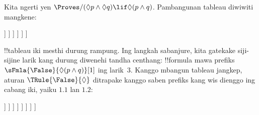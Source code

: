 \documentclass[../../../include/open-logic-section]{subfiles}
\begin{document}
{
\begin{ex}
  Kita ngerti yen $\Proves/ (\Diamond p \land \Diamond q) \lif \Diamond(p
  \land q)$. Pambangunan tableau diwiwiti mangkene:
  \begin{oltableau}
    [\pFmla{\False}{(\Diamond p \land \Diamond q) \lif \Diamond(p \land q)}{1},
      just = \TAss, checked
      [\pFmla{\True}{\Diamond p \land \Diamond q}{1},
        just = {\TRule{\False}{\lif}[1]}, checked
        [\pFmla{\False}{\Diamond(p \land q)}{1},
          just = {\TRule{\False}{\lif}[1]}
          [\pFmla{\True}{\Diamond p}{1},
            just = {\TRule{\True}{\land}[2]}, checked
            [\pFmla{\True}{\Diamond q}{1},
              just = {\TRule{\True}{\land}[2]}, checked
              [\pFmla{\True}{p}{1.1}, 
                just = {\TRule{\True}{\Diamond}[4]}, checked
                [\pFmla{\True}{q}{1.2}, 
                  just = {\TRule{\True}{\Diamond}[5]}, checked
                ]
              ]
            ]
          ]
        ]
      ]
    ]
  \end{oltableau}
  !!{tableau} iki mesthi durung rampung. Ing langkah sabanjure,
  kita gatekake siji-sijine larik kang durung diwenehi tandha centhang:
  !!{formula} mawa prefiks $\sFmla{\False}{\Diamond(p \land q)}[1]$
  ing larik~$3$. Kanggo mbangun tableau jangkep, aturan
  $\TRule{\False}{\Diamond}$ ditrapake kanggo saben prefiks kang wis
  dienggo ing cabang iki, yaiku $1.1$ lan $1.2$:
  \begin{oltableau}
    [\pFmla{\False}{(\Diamond p \land \Diamond q) \lif \Diamond(p \land q)}{1},
      just = \TAss, checked
      [\pFmla{\True}{\Diamond p \land \Diamond q}{1},
        just = {\TRule{\False}{\lif}[1]}, checked
        [\pFmla{\False}{\Diamond (p \land q)}{1},
          just = {\TRule{\False}{\lif}[1]}
          [\pFmla{\True}{\Diamond p}{1},
            just = {\TRule{\True}{\land}[2]}, checked
            [\pFmla{\True}{\Diamond q}{1},
              just = {\TRule{\True}{\land}[2]}, checked
              [\pFmla{\True}{p}{1.1}, 
                just = {\TRule{\True}{\Diamond}[4]}, checked
                [\pFmla{\True}{q}{1.2}, 
                  just = {\TRule{\True}{\Diamond}[5]}, checked
                  [\pFmla{\False}{p \land q}{1.1}, 
                    just = {\TRule{\False}{\Diamond}[3]}
                    [\pFmla{\False}{p \land q}{1.2}, 
                      just = {\TRule{\False}{\Diamond}[3]}
                    ]
                  ]
                ]
              ]
            ]
          ]
        ]
      ]
    ]
  \end{oltableau}

\end{ex}}
\end{document}
